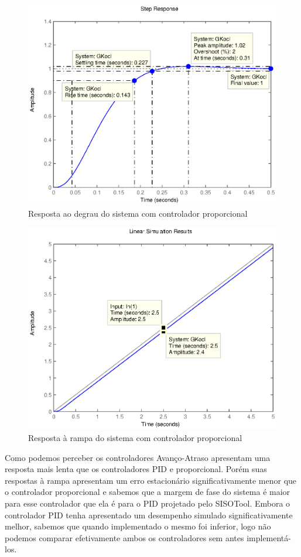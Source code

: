 \documentclass{article}
\begin{document}
 \begin{figure}[H]
 	\centering
 	\includegraphics[width=0.8\linewidth]{stepgkocl}
 	\caption{Resposta ao degrau do sistema com controlador proporcional}
 	\label{fig:stepgkocl}
 \end{figure}
 
 \begin{figure}[H]
 	\centering
 	\includegraphics[width=0.8\linewidth]{rampgkocl}
 	\caption{Resposta à rampa do sistema com controlador proporcional}
 	\label{fig:rampgkocl}
 \end{figure}
 
 Como podemos perceber os controladores Avanço-Atraso apresentam uma resposta mais lenta que os controladores PID e proporcional. Porém suas respostas à rampa apresentam um erro estacionário significativamente menor que o controlador proporcional e sabemos que a margem de fase do sistema é maior para esse controlador que ela é para o PID projetado pelo SISOTool. Embora o controlador PID tenha apresentado um desempenho simulado significativamente melhor, sabemos que quando implementado o mesmo foi inferior, logo não podemos comparar efetivamente ambos os controladores sem antes implementá-los.
 
\end{document}

